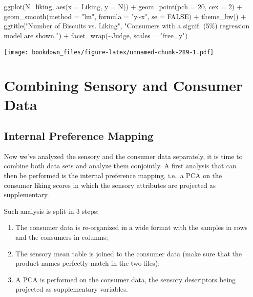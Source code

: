 \documentclass[
]{krantz}
\makeatletter
\newenvironment{Shaded}{\begin{snugshade}}{\end{snugshade}}
\newcommand{\AttributeTok}[1]{\textcolor[rgb]{0.61,0.61,0.61}{#1}}
\newcommand{\ConstantTok}[1]{\textcolor[rgb]{0,0,0}{#1}}
\newcommand{\DecValTok}[1]{\textcolor[rgb]{0.06,0.06,0.06}{#1}}
\newcommand{\FunctionTok}[1]{\textcolor[rgb]{0,0,0}{#1}}
\newcommand{\NormalTok}[1]{#1}
\newcommand{\SpecialCharTok}[1]{\textcolor[rgb]{0,0,0}{#1}}
\newcommand{\StringTok}[1]{\textcolor[rgb]{0.5,0.5,0.5}{#1}}
\providecommand{\tightlist}{%
  \setlength{\itemsep}{0pt}\setlength{\parskip}{0pt}}
\newenvironment{kframe}{%
\medskip{}
\setlength{\fboxsep}{.8em}
 \def\at@end@of@kframe{}%
 \ifinner\ifhmode%
  \def\at@end@of@kframe{\end{minipage}}%
  \begin{minipage}{\columnwidth}%
 \fi\fi%
 \def\FrameCommand##1{\hskip\@totalleftmargin \hskip-\fboxsep
 \colorbox{shadecolor}{##1}\hskip-\fboxsep
     \hskip-\linewidth \hskip-\@totalleftmargin \hskip\columnwidth}%
 \MakeFramed {\advance\hsize-\width
   \@totalleftmargin\z@ \linewidth\hsize
   \@setminipage}}%
 {\par\unskip\endMakeFramed%
 \at@end@of@kframe}
\renewenvironment{Shaded}{\begin{kframe}}{\end{kframe}}
\makeatother
\begin{document}
\begin{Shaded}
\begin{Highlighting}[]
\FunctionTok{ggplot}\NormalTok{(N\_liking, }\FunctionTok{aes}\NormalTok{(}\AttributeTok{x =}\NormalTok{ Liking, }\AttributeTok{y =}\NormalTok{ N)) }\SpecialCharTok{+}
  \FunctionTok{geom\_point}\NormalTok{(}\AttributeTok{pch =} \DecValTok{20}\NormalTok{, }\AttributeTok{cex =} \DecValTok{2}\NormalTok{) }\SpecialCharTok{+}
  \FunctionTok{geom\_smooth}\NormalTok{(}\AttributeTok{method =} \StringTok{"lm"}\NormalTok{, }\AttributeTok{formula =} \StringTok{"y\textasciitilde{}x"}\NormalTok{, }\AttributeTok{se =} \ConstantTok{FALSE}\NormalTok{) }\SpecialCharTok{+}
  \FunctionTok{theme\_bw}\NormalTok{() }\SpecialCharTok{+}
  \FunctionTok{ggtitle}\NormalTok{(}\StringTok{"Number of Biscuits vs. Liking"}\NormalTok{, }
          \StringTok{"Consumers with a signif. (5\%) regression model are shown."}\NormalTok{) }\SpecialCharTok{+}
  \FunctionTok{facet\_wrap}\NormalTok{(}\SpecialCharTok{\textasciitilde{}}\NormalTok{Judge, }\AttributeTok{scales =} \StringTok{"free\_y"}\NormalTok{)}
\end{Highlighting}
\end{Shaded}

\texttt{[image: bookdown\_files/figure-latex/unnamed-chunk-289-1.pdf]}

\hypertarget{combining-sensory-and-consumer-data}{%
\section{Combining Sensory and Consumer Data}\label{combining-sensory-and-consumer-data}}

\hypertarget{internal-preference-mapping}{%
\subsection{Internal Preference Mapping}\label{internal-preference-mapping}}

Now we've analyzed the sensory and the consumer data separately, it is time to combine both data sets and analyze them conjointly. A first analysis that can then be performed is the internal preference mapping, i.e.~a PCA on the consumer liking scores in which the sensory attributes are projected as supplementary.

Such analysis is split in 3 steps:

\begin{enumerate}
\def\labelenumi{\arabic{enumi}.}
\tightlist
\item
  The consumer data is re-organized in a wide format with the samples in rows and the consumers in columns;
\item
  The sensory mean table is joined to the consumer data (make sure that the product names perfectly match in the two files);
\item
  A PCA is performed on the consumer data, the sensory descriptors being projected as supplementary variables.
\end{enumerate}
\end{document}
